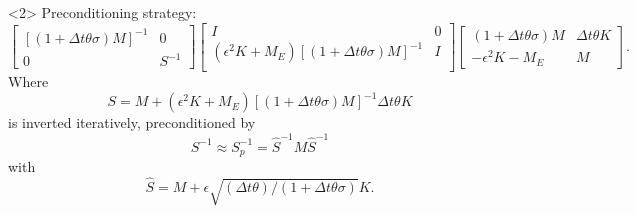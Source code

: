 \documentclass[presentation,aspectratio=43]{beamer}
\begin{document}
\begin{frame}
  \begin{onlyenv}<2> Preconditioning strategy: {\scriptsize
      \begin{equation*}
        \begin{bmatrix}
          \left[(1 + \Delta t \theta \sigma)M\right]^{-1}  & 0 \\
          0 & S^{-1}
        \end{bmatrix}
        \begin{bmatrix}
          I & 0\\
          (\epsilon^2 K + M_E)\left[(1 + \Delta t \theta
            \sigma)M\right]^{-1} & I\\
        \end{bmatrix}
        \begin{bmatrix}
          (1 + \Delta t \theta \sigma)M  & \Delta t\theta K \\
          -\epsilon^2 K - M_E & M
        \end{bmatrix}.
      \end{equation*}
    } Where
    \begin{equation*}
      S = M + (\epsilon^2 K + M_E) \left[(1 + \Delta t\theta\sigma)M\right]^{-1} \Delta t \theta K
    \end{equation*}
    is inverted iteratively, preconditioned by
    \begin{equation*}
      S^{-1} \approx S_p^{-1} = \hat{S}^{-1}M\hat{S}^{-1}
    \end{equation*}
    with
    \begin{equation*}
      \hat{S} = M + \epsilon\sqrt{(\Delta t \theta)/(1+\Delta t \theta\sigma)} K.
    \end{equation*}
  \end{onlyenv}
\end{frame}
\end{document}
